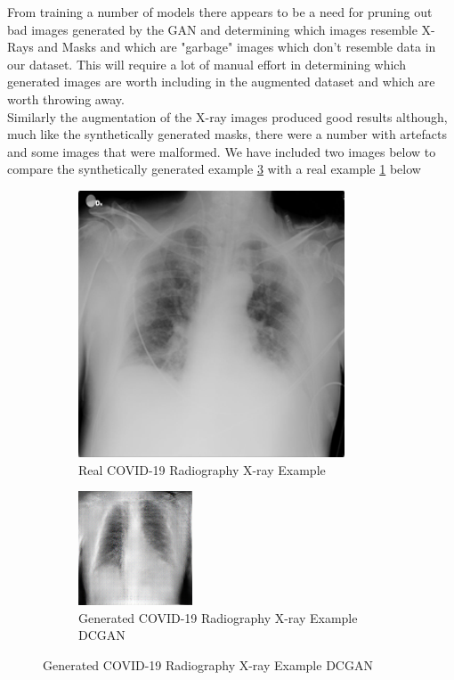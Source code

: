 From training a number of models there appears to be a need for pruning out bad images generated by the GAN and determining which images resemble X-Rays and Masks and which are "garbage" images which don't resemble data in our dataset.  This will require a lot of manual effort in determining which generated images are worth including in the augmented dataset and which are worth throwing away.
\\
Similarly the augmentation of the X-ray images produced good results although, much like the synthetically generated masks, there were a number with artefacts and some images that were malformed.  We have included two images below to compare the synthetically generated example \ref{fig:Synthetically Generated COVID-19 Radiography X-ray(DCGAN)}  with a real example \ref{fig:Real COVID-19 Radiography X-ray Example} below
 \begin{figure}[H]
    \centering
    \begin{subfigure}{.35\textwidth}
    \centering
      \includegraphics[width=.4\linewidth,keepaspectratio]{Images/ExampleofXrayRadiographyCOVID19.png}
      \caption{Real COVID-19 Radiography X-ray Example}
      \label{fig:Real COVID-19 Radiography X-ray Example}
    \end{subfigure}\hfill%
    \begin{subfigure}{.35\textwidth}
    \centering
      \includegraphics[width=.4\linewidth,keepaspectratio]{Images/SyntheticRadiographyXrayCOVID19Example.png}
      \caption{Generated COVID-19 Radiography X-ray Example DCGAN}
      \label{fig:Synthetically Generated COVID-19 Radiography X-ray(DCGAN)}
    \end{subfigure}\hfill%
\end{figure}
